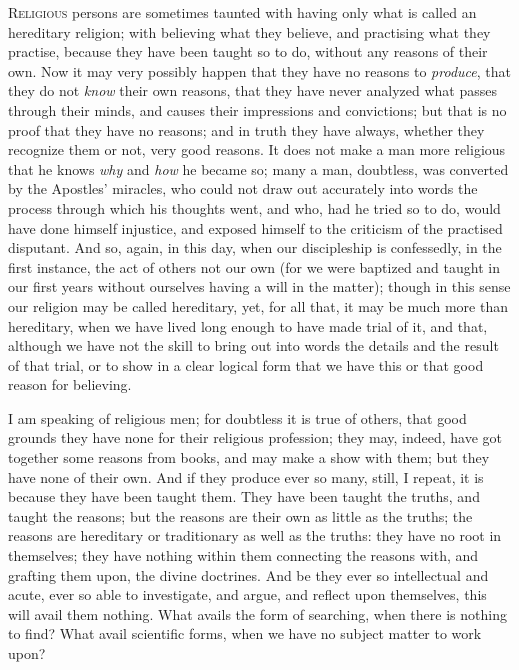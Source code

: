 R\textsc{eligious} persons are sometimes taunted with having only what is
called an hereditary religion; with believing what they believe, and
practising what they practise, because they have been taught so to do,
without any reasons of their own. Now it may very possibly happen that
they have no reasons to \emph{produce}, that they do not \emph{know}
their own reasons, that they have never analyzed what passes through
their minds, and causes their impressions and convictions; but that is
no proof that they have no reasons; and in truth they have always,
whether they recognize them or not, very good reasons. It does not
make a man more religious that he knows \emph{why} and \emph{how} he
became so; many a man, doubtless, was converted by the Apostles'
miracles, who could not draw out accurately into words the process
through which his thoughts went, and who, had he tried so to do, would
have done himself injustice, and exposed himself to the criticism of
the practised disputant. And so, again, in this day, when our
discipleship is confessedly, in the first instance, the act of others
not our own (for we were baptized and taught in our first years
without ourselves having a will in the matter); though in this sense
our religion may be called hereditary, yet, for all that, it may be
much more than hereditary, when we have lived long enough to have made
trial of it, and that, although we have not the skill to bring out
into words the details and the result of that trial, or to show in a
clear logical form that we have this or that good reason for
believing.

I am speaking of religious men; for doubtless it is true of others,
that good grounds they have none for their religious profession; they
may, indeed, have got together some reasons from books, and may make a
show with them; but they have none of their own. And if they produce
ever so many, still, I repeat, it is because they have been taught
them. They have been taught the truths, and taught the reasons; but
the reasons are their own as little as the truths; the reasons are
hereditary or traditionary as well as the truths: they have no root in
themselves; they have nothing within them connecting the reasons with,
and grafting them upon, the divine doctrines. And be they ever so
intellectual and acute, ever so able to investigate, and argue, and
reflect upon themselves, this will avail them nothing. What avails the
form of searching, when there is nothing to find? What avail
scientific forms, when we have no subject matter to work upon?

